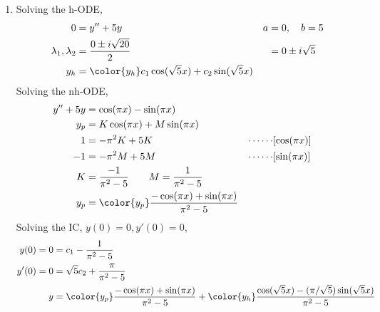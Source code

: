\begin{enumerate}
    \item Solving the h-ODE,
          \begin{align}
              0                        & = y'' + 5y                         &
              a                        & = 0, \quad b = 5                     \\
              \lambda_{1}, \lambda_{2} & = \frac{0 \pm i\sqrt{20}}{2}       &
                                       & = 0 \pm i\sqrt{5}                    \\
              y_{h}                    & = \color{y_h} c_{1}\cos(\sqrt{5}x)
              + c_{2}\sin(\sqrt{5}x)
          \end{align}
          Solving the nh-ODE,
          \begin{align}
              y'' + 5y     & = \cos(\pi x) - \sin(\pi x)         \\
              y_{p}        & = K\cos(\pi x) + M\sin(\pi x)       \\
              1            & = -\pi^{2}K + 5K                  &
              \cdots\cdots & [\cos(\pi x)]                       \\
              -1           & = -\pi^{2}M + 5M                  &
              \cdots\cdots & [\sin(\pi x)]                       \\
              K            & = \frac{-1}{\pi^{2} - 5} \qquad M
              = \frac{1}{\pi^{2} - 5}                            \\
              y_{p}        & = \color{y_p} \frac{-\cos(\pi x)
                  + \sin(\pi x)}{\pi^{2} - 5}
          \end{align}
          Solving the IC, $ y(0) = 0, y'(0) = 0 $,
          \begin{align}
              y(0) = 0  & = c_{1} - \frac{1}{\pi^{2} - 5}   \\
              y'(0) = 0 & = \sqrt{5}c_{2}
              + \frac{\pi}{\pi^{2} - 5}                     \\
              y         & = {\color{y_p} \frac{-\cos(\pi x)
                  + \sin(\pi x)}{\pi^{2} - 5} }
              + {\color{y_h} \frac{\cos(\sqrt{5}x)
                  - (\pi/\sqrt{5})\sin(\sqrt{5}x) }{\pi^{2} - 5}}
          \end{align}


\end{enumerate}
